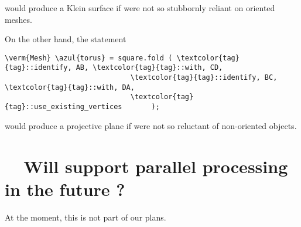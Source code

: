 \noindent would produce a Klein surface if {\maniFEM} were not so stubbornly reliant on
oriented meshes.

On the other hand, the statement

\begin{Verbatim}[commandchars=\\\{\},formatcom=\small\tt,
   baselinestretch=0.94,framesep=2mm                     ]
   \verm{Mesh} \azul{torus} = square.fold ( \textcolor{tag}{tag}::identify, AB, \textcolor{tag}{tag}::with, CD,
                              \textcolor{tag}{tag}::identify, BC, \textcolor{tag}{tag}::with, DA,
                              \textcolor{tag}{tag}::use_existing_vertices       );
\end{Verbatim}

\noindent would produce a projective plane if {\maniFEM} were not so reluctant of
non-oriented objects.


\section{~~Will {\maniFEM} support parallel processing in the future ?}
\label{\numb section 13.\numb parag 6}

At the moment, this is not part of our plans.


